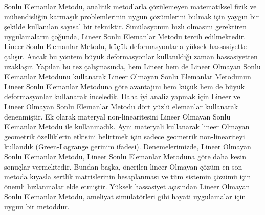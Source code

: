 \documentclass{buthesis}
\begin{document}
\begin{ozet}
\indent Sonlu Elemanlar Metodu, analitik metodlarla \c{c}{\"o}z{\"u}lemeyen matematiksel fizik ve m{\"u}hendisli\u{g}in karma\c{s}{\i}k  problemlerinin uygun \c{c}{\"o}z{\"u}mlerini bulmak i\c{c}in yayg{\i}n bir \c{s}ekilde kullan{\i}lan say{\i}sal bir tekniktir. Sim{\"u}lasyonun h{\i}zl{\i} olmas{\i}n{\i} gerektiren uygulamalar{\i}n \c{c}o\u{g}unda, Lineer Sonlu Elemanlar Metodu tercih edilmektedir. Lineer Sonlu Elemanlar Metodu, k{\"u}\c{c}{\"u}k deformasyonlarla y{\"u}ksek hassasiyette \c{c}al{\i}\c{s}{\i}r. Ancak bu y{\"o}ntem b{\"u}y{\"u}k deformasyonlar kullan{\i}ld{\i}\u{g}{\i} zaman hassasiyetten uzakla\c{s}{\i}r. Yap{\i}lan bu tez \c{c}al{\i}\c{s}mas{\i}nda, hem Lineer hem de Lineer Olmayan Sonlu Elemanlar Metodunu kullanarak Lineer Olmayan Sonlu Elemanlar Metodunun Lineer Sonlu Elemanlar Metoduna g{\"o}re avantaj{\i}n{\i} hem k{\"u}\c{c}{\"u}k hem de b{\"u}y{\"u}k deformasyonlar kullanarak inceledik. Daha iyi analiz yapmak i\c{c}in Lineer ve Lineer Olmayan Sonlu Elemanlar Metodu d{\"o}rt y{\"u}zl{\"u} elemanlar kullanarak denenmi\c{s}tir. Ek olarak materyal non-linearitesini Lineer Olmayan Sonlu Elemanlar Metodu ile kullanmad{\i}k. Ayn{\i} materyali kullanarak lineer Olmayan geometrik {\"o}zelliklerin etkisini belirtmek i\c{c}in sadece geometrik non-lineariteyi kulland{\i}k (Green-Lagrange gerinim ifadesi). Denemelerimizde, Lineer Olmayan Sonlu Elemanlar Metodu, Lineer Sonlu Elemanlar Metoduna g{\"o}re daha kesin sonu\c{c}lar vermektedir. Bundan ba\c{s}ka, {\"o}nerilen lineer Olmayan \c{c}{\"o}z{\"u}m en son metoda k{\i}yasla sertlik matrislerinin hesaplanmas{\i} ve t{\"u}m sistemin \c{c}{\"o}z{\"u}m{\"u} i\c{c}in {\"o}nemli h{\i}zlanmalar elde etmi\c{s}tir. Y{\"u}ksek hassasiyet a\c{c}{\i}s{\i}ndan Lineer Olmayan Sonlu Elemanlar Metodu, ameliyat sim{\"u}lat{\"o}rleri gibi hayati uygulamalar i\c{c}in uygun bir metoddur.
\end{ozet}
\end{document}
